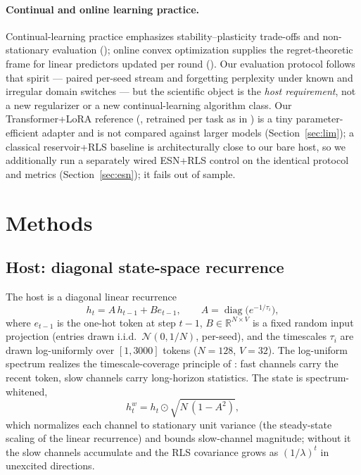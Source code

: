 \documentclass[preprint,12pt]{elsarticle}
\begin{document}
\paragraph{Continual and online learning practice.}
Continual-learning practice emphasizes stability--plasticity trade-offs
and non-stationary evaluation (\cite{parisi2019}); online convex
optimization supplies the regret-theoretic frame for linear predictors
updated per round (\cite{zinkevich2003,cesabianchi2006}). Our
evaluation protocol follows that spirit --- paired per-seed stream and
forgetting perplexity under known and irregular domain switches ---
but the scientific object is the \emph{host requirement}, not a new
regularizer or a new continual-learning algorithm class. Our
Transformer+LoRA reference (\cite{hu2022lora}, retrained per task as
in \cite{redemc}) is a tiny parameter-efficient adapter and is not
compared against larger models (Section~\ref{sec:lim}); a classical
reservoir+RLS baseline is architecturally close to our bare host, so
we additionally run a separately wired ESN+RLS control on the identical
protocol and metrics (Section~\ref{sec:esn}); it fails out of sample.

\section{Methods}
\label{sec:methods}

\subsection{Host: diagonal state-space recurrence}
\label{sec:host}

The host is a diagonal linear recurrence
\begin{equation}
h_t = A\, h_{t-1} + B e_{t-1}, \qquad
A = \operatorname{diag}\big(e^{-1/\tau_i}\big),
\label{eq:recur}
\end{equation}
where $e_{t-1}$ is the one-hot token at step $t-1$, $B \in
\mathbb{R}^{N \times V}$ is a fixed random input projection
(entries drawn i.i.d.\ $\mathcal{N}(0, 1/N)$, per-seed), and the
timescales $\tau_i$ are drawn log-uniformly over $[1, 3000]$ tokens
($N = 128$, $V = 32$). The log-uniform spectrum realizes the
timescale-coverage principle of \cite{redemc}: fast channels carry the
recent token, slow channels carry long-horizon statistics. The state is
spectrum-whitened,
\begin{equation}
h^w_t = h_t \odot \sqrt{N\,(1 - A^2)},
\label{eq:whiten}
\end{equation}
which normalizes each channel to stationary unit variance (the
steady-state scaling of the linear recurrence) and bounds slow-channel
magnitude; without it the slow channels accumulate and the RLS
covariance grows as $(1/\lambda)^t$ in unexcited directions.
\end{document}
